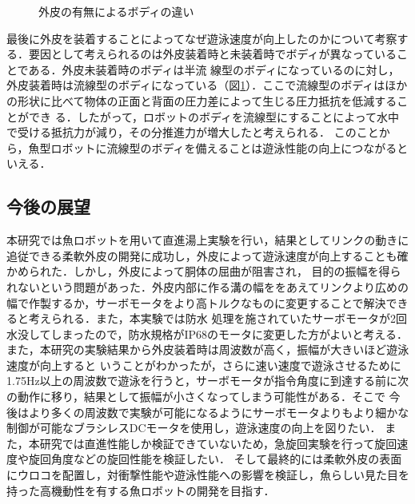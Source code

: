 \begin{figure}[t]
    \centering
    \caption{外皮の有無によるボディの違い}
    \label{fig:body}
\end{figure}

最後に外皮を装着することによってなぜ遊泳速度が向上したのかについて考察する．要因として考えられるのは外皮装着時と未装着時でボディが異なっていることである．外皮未装着時のボディは半流
線型のボディになっているのに対し，外皮装着時は流線型のボディになっている（図\ref{fig:body}）．ここで流線型のボディはほかの形状に比べて物体の正面と背面の圧力差によって生じる圧力抵抗を低減することができ
る．したがって，ロボットのボディを流線型にすることによって水中で受ける抵抗力が減り，その分推進力が増大したと考えられる．
このことから，魚型ロボットに流線型のボディを備えることは遊泳性能の向上につながるといえる．

\subsection{今後の展望}
本研究では魚ロボットを用いて直進湯上実験を行い，結果としてリンクの動きに追従できる柔軟外皮の開発に成功し，外皮によって遊泳速度が向上することも確かめられた．しかし，外皮によって胴体の屈曲が阻害され，
目的の振幅を得られないという問題があった．外皮内部に作る溝の幅ををあえてリンクより広めの幅で作製するか，サーボモータをより高トルクなものに変更することで解決できると考えられる．また，本実験では防水
処理を施されていたサーボモータが2回水没してしまったので，防水規格がIP68のモータに変更した方がよいと考える．また，本研究の実験結果から外皮装着時は周波数が高く，振幅が大きいほど遊泳速度が向上すると
いうことがわかったが，さらに速い速度で遊泳させるために1.75Hz以上の周波数で遊泳を行うと，サーボモータが指令角度に到達する前に次の動作に移り，結果として振幅が小さくなってしまう可能性がある．そこで
今後はより多くの周波数で実験が可能になるようにサーボモータよりもより細かな制御が可能なブラシレスDCモータを使用し，遊泳速度の向上を図りたい．
また，本研究では直進性能しか検証できていないため，急旋回実験を行って旋回速度や旋回角度などの旋回性能を検証したい．
そして最終的には柔軟外皮の表面にウロコを配置し，対衝撃性能や遊泳性能への影響を検証し，魚らしい見た目を持った高機動性を有する魚ロボットの開発を目指す．